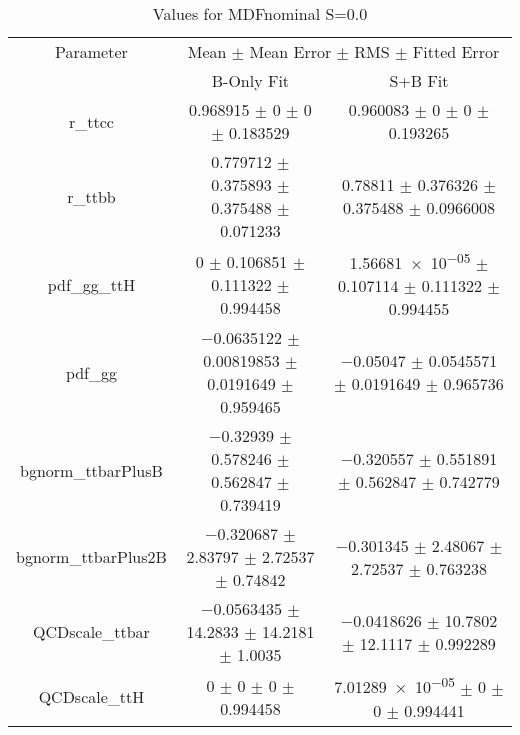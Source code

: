 \begin{table}
\centering
\caption{Values for MDFnominal S=0.0}
\begin{tabular}{ccc}
\toprule
Parameter & \multicolumn{2}{c}{Mean $\pm$ Mean Error $\pm$ RMS $\pm$ Fitted Error}\\
 & B-Only Fit & S+B Fit\\
\midrule
r\_ttcc & \num{0.968915} $\pm$ \num{0} $\pm$ \num{0} $\pm$ \num{0.183529} & \num{0.960083} $\pm$ \num{0} $\pm$ \num{0} $\pm$ \num{0.193265}\\
r\_ttbb & \num{0.779712} $\pm$ \num{0.375893} $\pm$ \num{0.375488} $\pm$ \num{0.071233} & \num{0.78811} $\pm$ \num{0.376326} $\pm$ \num{0.375488} $\pm$ \num{0.0966008}\\
pdf\_gg\_ttH & \num{0} $\pm$ \num{0.106851} $\pm$ \num{0.111322} $\pm$ \num{0.994458} & \num{1.56681e-05} $\pm$ \num{0.107114} $\pm$ \num{0.111322} $\pm$ \num{0.994455}\\
pdf\_gg & \num{-0.0635122} $\pm$ \num{0.00819853} $\pm$ \num{0.0191649} $\pm$ \num{0.959465} & \num{-0.05047} $\pm$ \num{0.0545571} $\pm$ \num{0.0191649} $\pm$ \num{0.965736}\\
bgnorm\_ttbarPlusB & \num{-0.32939} $\pm$ \num{0.578246} $\pm$ \num{0.562847} $\pm$ \num{0.739419} & \num{-0.320557} $\pm$ \num{0.551891} $\pm$ \num{0.562847} $\pm$ \num{0.742779}\\
bgnorm\_ttbarPlus2B & \num{-0.320687} $\pm$ \num{2.83797} $\pm$ \num{2.72537} $\pm$ \num{0.74842} & \num{-0.301345} $\pm$ \num{2.48067} $\pm$ \num{2.72537} $\pm$ \num{0.763238}\\
QCDscale\_ttbar & \num{-0.0563435} $\pm$ \num{14.2833} $\pm$ \num{14.2181} $\pm$ \num{1.0035} & \num{-0.0418626} $\pm$ \num{10.7802} $\pm$ \num{12.1117} $\pm$ \num{0.992289}\\
QCDscale\_ttH & \num{0} $\pm$ \num{0} $\pm$ \num{0} $\pm$ \num{0.994458} & \num{7.01289e-05} $\pm$ \num{0} $\pm$ \num{0} $\pm$ \num{0.994441}\\
\bottomrule
\end{tabular}
\end{table}